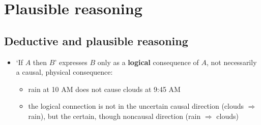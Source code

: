 \documentclass[9pt, letterpaper]{article}
\begin{document}
\section{Plausible reasoning}

\subsection{Deductive and plausible reasoning}

\begin{itemize}
    \begin{item}
        \textbf{Deductive reasoning} can be broken down into a \textbf{strong syllogism} (logical argument)
        \begin{align*}
            &\text{if } A \text{ is true, then } B \text{ is true} \\
            &\frac{A \text{ is true}}{\text{therefore, } B \text{ is true}}
        \end{align*}
        and its inverse:
        \begin{align*}
            &\text{if } A \text{ is true, then } B \text{ is true} \\
            &\frac{B \text{ is false}}{\text{therefore, } A \text{ is false.}}
        \end{align*}
    \end{item}
    \begin{item}
        In almost all situations, we do not have the right information to allow this kind of reasoning, so we fall back on \textbf{weaker syllogisms}:
         \begin{align*}
             &\text{if } A \text{ is true, then } B \text{ is true} \\
             &\frac{B \text{ is true}}{\text{therefore, } A \text{ becomes more plausible}}
         \end{align*}
    \end{item}
    \item{`If $A$ then $B$' expresses $B$ only as a \textbf{logical} consequence of $A$, not necessarily a causal, physical consequence:}
        \begin{itemize}
            \item{rain at 10 AM does not cause clouds at 9:45 AM}
            \item{the logical connection is not in the uncertain causal direction (clouds $\Rightarrow$ rain), but the certain, though noncausal direction (rain $\Rightarrow$ clouds)}
        \end{itemize}

\end{itemize}
\end{document}
